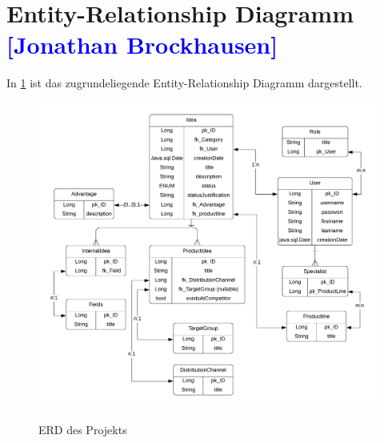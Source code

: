 

\section{Entity-Relationship Diagramm \textcolor{blue}{[Jonathan Brockhausen]}}

In \cref{fig:erd} ist das zugrundeliegende Entity-Relationship Diagramm dargestellt.

\begin{figure}[h!!]
    \centering
    \begin{minipage}[t]{1\textwidth}
        \caption{ERD des Projekts}
        \includegraphics[width=1\textwidth]{img/erd.png}\\
        \label{fig:erd}
    \end{minipage}
\end{figure}

